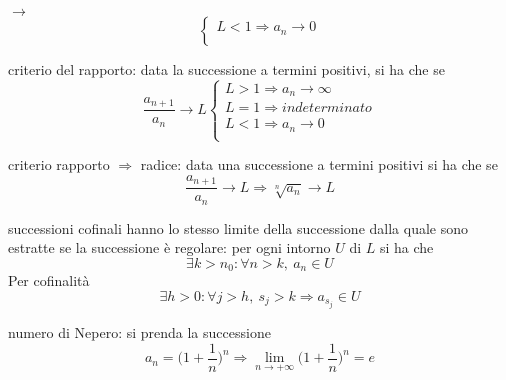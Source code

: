 \documentclass[12pt,a4paper]{article}
\begin{document}
\begin{list}{$\rightarrow$}{}
\[\begin{cases}
    L < 1 \Rightarrow a_n \to 0\\    
    \end{cases}\]
    \item criterio del rapporto: data la successione a termini positivi, si ha che se \[\dfrac{a_{n+1}}{a_n} \to L 
    \begin{cases}
    L > 1 \Rightarrow a_n \to \infty\\
    L = 1 \Rightarrow indeterminato\\
    L < 1 \Rightarrow a_n \to 0\\            
    \end{cases}\]
    \item criterio rapporto $\Rightarrow$ radice: data una successione a termini positivi si ha che se \[\dfrac{a_{n+1}}{a_n} \to L \Rightarrow \sqrt[n]{a_n} \to L\]
    \item successioni cofinali hanno lo stesso limite della successione dalla quale sono estratte se la successione è regolare: per ogni intorno $U$ di $L$ si ha che \[\exists k > n_0 : \forall n > k, \: a_n \in U\] Per cofinalità \[\exists h > 0 : \forall j > h, \: s_j > k \Rightarrow a_{s_j} \in U\]
    \item numero di Nepero: si prenda la successione \[a_n = \biggl(1 + \dfrac{1}{n}\biggr)^n \Rightarrow \lim_{n \to +\infty} \biggl(1 + \dfrac{1}{n}\biggr)^n = e \]
\end{list}
\end{document}
